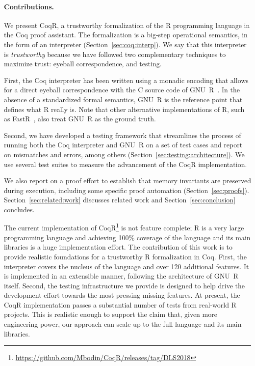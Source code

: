 \documentclass[
    sigplan,
    10pt,
    review, %
    natbib=false %
 ]{acmart}
\newcommand\et[1]{\todo[color=blue!20,size=\scriptsize]{#1}}
\newcommand\CoqR{CoqR}
\begin{document}
\paragraph{Contributions.}
We present \CoqR{}, a trustworthy formalization of the R programming language in the Coq proof assistant.
The formalization is a big-step operational semantics, in the form of an interpreter (Section~\ref{sec:coq:interp}).
%
We say that this interpreter is {\em trustworthy} because we have followed two complementary techniques to maximize trust: eyeball correspondence, and testing.

First, the Coq interpreter has been written using a monadic encoding that allows for a direct eyeball correspondence with the C source code of GNU~R~\parencite{Rwebsite}. In the absence of a standardized formal semantics, GNU~R is the reference point that defines what R really is. Note that other alternative implementations of R, such as FastR~\parencite{kalibera2014fast}, also treat GNU~R as the ground truth.

Second, we have developed a testing framework that streamlines the process of running both the Coq interpreter and GNU~R on a set of test cases and report on mismatches and errors, among others (Section~\ref{sec:testing:architecture}). We use several test suites to measure the advancement of the \CoqR{} implementation.

We also report on a proof effort to establish that memory invariants are preserved during execution, including some specific proof automation (Section~\ref{sec:proofs}).
%
Section~\ref{sec:related:work} discusses related work and Section~\ref{sec:conclusion} concludes.


The current implementation of \CoqR{}\footnote{\url{https://github.com/Mbodin/CoqR/releases/tag/DLS2018}} is not feature complete; R is a very large programming language and achieving 100\% coverage of the language and its main libraries is a huge implementation effort. The contribution of this work is to provide realistic foundations for a trustworthy R formalization in Coq.
First, the interpreter covers the nucleus of the language and over 120 additional features. It is implemented in an extensible manner, following the architecture of GNU~R itself. Second, the testing infrastructure we provide is designed to help drive the development effort towards the most pressing missing features. At present, the \CoqR{} implementation passes a substantial number of tests from real-world R projects. This is realistic enough to support the claim that, given more engineering power, our approach can scale up to the full language and its main libraries.
\end{document}
